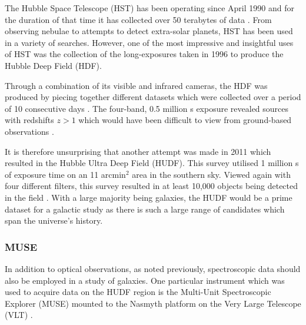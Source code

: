 \documentclass[12pt, twocolumn]{revtex4}    %
\begin{document}
The Hubble Space Telescope (HST) has been operating since April 1990 and for the duration of that time it has collected over 50 terabytes of data \citep{mccoy_space_sciences}. From observing nebulae to attempts to detect extra-solar planets, HST has been used in a variety of searches. However, one of the most impressive and insightful uses of HST was the collection of the long-exposures taken in 1996 to produce the Hubble Deep Field (HDF). 

Through a combination of its visible and infrared cameras, the HDF was produced by piecing together different datasets which were collected over a period of 10 consecutive days \citep{mccoy_space_sciences, williams_hdp}. The four-band, 0.5 million s exposure revealed sources with redshifts $z>1$ which would have been difficult to view from ground-based observations \citep{beckwith_hudf}. 


It is therefore unsurprising that another attempt was made in 2011 which resulted in the Hubble Ultra Deep Field (HUDF). This survey utilised 1 million s of exposure time on an 11 arcmin$^2$ area in the southern sky. Viewed again with four different filters, this survey resulted in at least 10,000 objects being detected in the field \citep{beckwith_hudf}. With a large majority being galaxies, the HUDF would be a prime dataset for a galactic study as there is such a large range of candidates which span the universe's history. 



\subsubsection{MUSE}

In addition to optical observations, as noted previously, spectroscopic data should also be employed in a study of galaxies. One particular instrument which was used to acquire data on the HUDF region is the Multi-Unit Spectroscopic Explorer (MUSE) mounted to the Nasmyth platform on the Very Large Telescope (VLT) \citep{bacon_muse_proposal}. 

\end{document}
